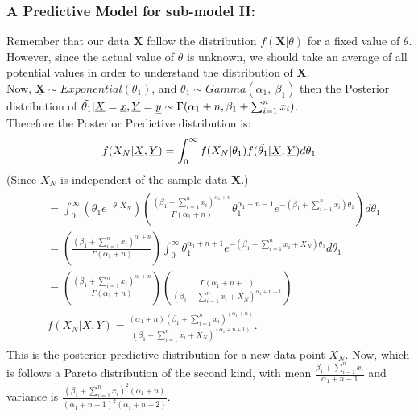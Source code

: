 \documentclass[12pt]{article}    %
\numberwithin{equation}{section}
\begin{document}
\subsubsection{A Predictive Model for sub-model II:}
Remember that our data \textbf{X} follow the distribution $f(\textbf{X}|\theta)$ for a fixed value of $\theta$. However, since the actual value of $\theta$ is unknown, we should take an average of all potential values in order to understand the distribution of $\textbf{X}$.\\
Now, $\underline{\boldsymbol{X}} \sim Exponential(\theta_1)$, and $\theta_1 \sim Gamma(\alpha_1, ~\beta_1)$ then the Posterior distribution of $\Tilde{\theta_1}|\underline{X}=\underline{x},\underline{Y}=\underline{y} \sim \Gamma(\alpha_1+n,  \beta_1+\sum^n_{i=1}x_i)$. \\
Therefore the Posterior Predictive distribution is:\\
\begin{equation*}
f(X_N|\underline{X},\underline{Y}) = \int_0^{\infty}f(X_N|\theta_1)f(\Tilde{\theta_1}|\underline{X},\underline{Y})d\theta_1
\end{equation*}
(Since $X_N$ is independent of the sample data $\boldsymbol{X}$.)
\begin{align*}
\begin{split}
&= \int_0^{\infty}\left(\theta_1 e^{-\theta_1X_N}\right)\left(\frac{(\beta_1+\sum^n_{i=1}x_i)^{\alpha_1+n}}{\Gamma(\alpha_1+n)
}\theta_1^{\alpha_1+n-1}e^{-(\beta_1+\sum^n_{i=1}x_i)\theta_1}\right)d\theta_1 \\
&= \left(\frac{(\beta_1+\sum^n_{i=1}x_i)^{\alpha_1+n}}{\Gamma(\alpha_1+n)}\right)\int_0^{\infty}\theta_1^{\alpha_1+n+1}e^{-(\beta_1+\sum^n_{i=1}x_i+X_N)\theta_1}d\theta_1\\
&= \left(\frac{(\beta_1+\sum^n_{i=1}x_i)^{\alpha_1+n}}{\Gamma(\alpha_1+n)}\right)\left(\frac{\Gamma(\alpha_1+n+1)}{(\beta_1+\sum^n_{i=1}x_i+X_N)^{\alpha_1+n+1}}\right)\\
& f(X_N|\underline{X},\underline{Y}) = \frac{(\alpha_1+n)(\beta_1+\sum^n_{i=1}x_i)^{(\alpha_1+n)}}{(\beta_1+\sum^n_{i=1}x_i+X_N)^{(\alpha_1+n+1)}}.
\end{split}
\end{align*}
This is the posterior predictive distribution for a new data point $X_N$. Now, which is follows a Pareto distribution of the second kind, with mean $\frac{\beta_1+\sum^n_{i=1}x_i}{\alpha_1+n-1}$ and variance is $\frac{(\beta_1+\sum^n_{i=1}x_i)^2(\alpha_1+n)}{(\alpha_1+n-1)^2(\alpha_1+n-2)}$. \\
\end{document}
